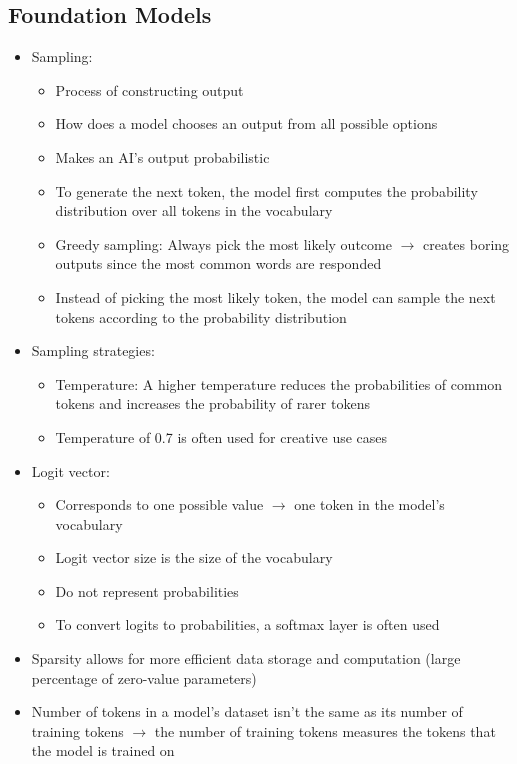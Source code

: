 \documentclass[11pt]{scrartcl}
\begin{document}
\subsection*{Foundation Models}
\begin{itemize}
	\item Sampling: 
	\begin{itemize}
		\item Process of constructing output
		\item How does a model chooses an output from all possible options
		\item Makes an AI's output probabilistic
		\item To generate the next token, the model first computes the probability distribution over all tokens in the vocabulary
		\item Greedy sampling: Always pick the most likely outcome $\to$ creates boring outputs since the most common words are responded
		\item Instead of picking the most likely token, the model can sample the next tokens according to the probability distribution
	\end{itemize}
	\item Sampling strategies:
	\begin{itemize}
		\item Temperature: A higher temperature reduces the probabilities of common tokens and increases the probability of rarer tokens
		\item Temperature of 0.7 is often used for creative use cases
	\end{itemize}
	\item Logit vector:
	\begin{itemize}
		\item Corresponds to one possible value $\to$ one token in the model's vocabulary
		\item Logit vector size is the size of the vocabulary
		\item Do not represent probabilities
		\item To convert logits to probabilities, a softmax layer is often used
	\end{itemize}
	\item Sparsity allows for more efficient data storage and computation (large percentage of zero-value parameters)
	\item Number of tokens in a model's dataset isn't the same as its number of training tokens $\to$ the number of training tokens measures the tokens that the model is trained on

\end{itemize}
\end{document}
